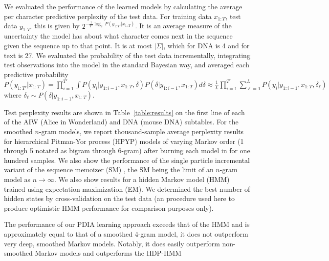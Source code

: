 We evaluated the performance of the learned models by calculating the average per character predictive perplexity of the test data.  For training data $x_{1:T}$, test data $y_{1:T'}$ this is given by $2^{-\frac{1}{T'}\log_2\, P(y_{1:T'}|x_{1:T})}$.  It is an average measure of the uncertainty the model has about what character comes next in the sequence given the sequence up to that point. It is at most $|\Sigma|$, which for DNA is 4 and for text is 27.  We evaluated the probability of the test data incrementally, integrating test observations into the model in the standard Bayesian way, and averaged each predictive probability $P(y_{1:T'}|x_{1:T}) =  \prod_{i = 1}^{T'} \int P(y_i|y_{1:i-1},x_{1:T},\delta)P(\delta|y_{1:i-1},x_{1:T})d\delta \approx \frac{1}{L}\prod_{i = 1}^{T'} \sum_{\ell = 1}^{L} P(y_i|y_{1:i-1},x_{1:T},\delta_\ell)$ where $\delta_\ell \sim P(\delta|y_{1:i-1},x_{1:T})$.  %

Test perplexity results are shown in Table~\ref{table:results} on the first line of each of the AIW (Alice in Wonderland) and DNA (mouse DNA) subtables.  
For the smoothed $n$-gram models, we report thousand-sample average perplexity results for hierarchical Pitman-Yor process (HPYP) \cite{Teh2006a} models of varying Markov order (1 through 5 notated as bigram through 6-gram) after burning each model in for one hundred samples.  We also show the performance of the single particle incremental variant of the sequence memoizer (SM) \cite{Gasthaus2010}, the SM being the limit of an $n$-gram model as $n\rightarrow\infty$.
We also show results for a hidden Markov model (HMM) \cite{Murphy2005} trained using expectation-maximization (EM).  We determined the best number of hidden states by cross-validation on the test data (an procedure used here to produce optimistic HMM performance for comparison purposes only).  


The performance of our PDIA learning approach exceeds that of the HMM and is approximately equal to that of a smoothed 4-gram model, it does not outperform very deep, smoothed Markov models.  Notably, it does easily outperform non-smoothed Markov models and outperforms the HDP-HMM 

